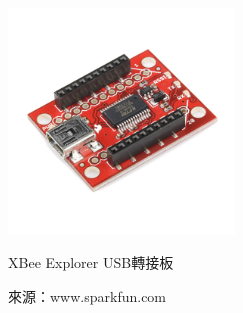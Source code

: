 \begin{figure}[h!]
	\centering
	\includegraphics[width=6cm]{figures/xbee2usb}
	\caption{XBee Explorer USB轉接板}
	\caption*{來源：www.sparkfun.com}
	\label{f:xbee2usb}
\end{figure}

